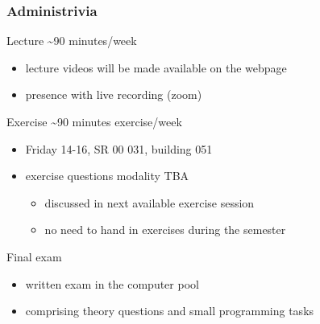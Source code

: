 \documentclass{beamer}
\begin{document}
\begin{frame}
  \frametitle{Administrivia}
  \begin{block}{Lecture \~{}90 minutes/week}
    \begin{itemize}
    \item lecture videos will be made available on the webpage
    \item presence with live recording (zoom)
    \end{itemize}
  \end{block}
  \begin{block}{Exercise  \~{}90 minutes exercise/week}
    \begin{itemize}
    \item Friday 14-16, SR 00 031, building 051
    \item exercise questions modality TBA
    \begin{itemize}
    \item discussed in next available exercise session
    \item no need to hand in exercises during the semester
    \end{itemize}
  \end{itemize}
\end{block}
\begin{block}{Final exam}
  \begin{itemize}
  \item written exam in the computer pool
  \item comprising theory questions and small programming tasks
  \end{itemize}
\end{block}
\end{frame}

\end{document}
